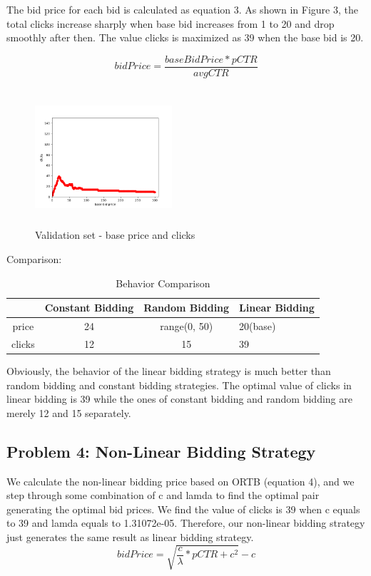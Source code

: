 \documentclass{sig-alternate-05-2015}
\begin{document}
The bid price for each bid is calculated as equation 3. As shown in Figure 3, the total clicks increase sharply when base bid increases from 1 to 20 and drop smoothly after then. The value clicks is maximized as 39 when the base bid is 20.

\begin{equation}bidPrice=\frac{baseBidPrice*pCTR}{avgCTR}\end{equation}

\begin{figure}
\centering
\includegraphics[height=2in, width=2in]{images/base_bid_price.png}
\caption{Validation set - base price and clicks}
\end{figure}

Comparison:
\begin{table}
\centering
\caption{Behavior Comparison}
\begin{tabular}{|c|c|c|l|} \hline
&Constant Bidding&Random Bidding&Linear Bidding\\ \hline
price&24&range(0, 50)&20(base)\\ \hline
clicks&12& 15&39\\
\hline\end{tabular}
\end{table}

Obviously, the behavior of the linear bidding strategy is much better than random bidding and constant bidding strategies. The optimal value of clicks in linear bidding is 39 while the ones of constant bidding and random bidding are merely 12 and 15 separately.

\subsection{Problem 4: Non-Linear Bidding Strategy}
We calculate the non-linear bidding price based on ORTB (equation 4), and we step through some combination of c and lamda to find the optimal pair generating the optimal bid prices. We find the value of clicks is 39 when c equals to 39 and lamda equals to 1.31072e-05. Therefore, our non-linear bidding strategy just generates the same result as linear bidding strategy.
\begin{equation}bidPrice=\sqrt{\frac{c}{\lambda} * pCTR + c^2} - c\end{equation}
\end{document}
